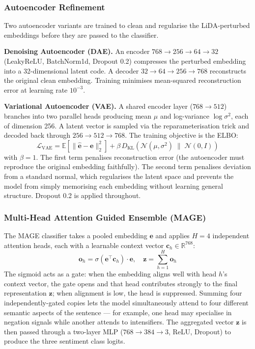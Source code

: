 \documentclass[conference]{IEEEtran}
\begin{document}
\subsubsection{Autoencoder Refinement}
Two autoencoder variants are trained to clean and regularise the
LiDA-perturbed embeddings before they are passed to the classifier.

\textbf{Denoising Autoencoder (DAE).} An encoder
$768 \to 256 \to 64 \to 32$ (LeakyReLU, BatchNorm1d, Dropout 0.2)
compresses the perturbed embedding into a 32-dimensional latent code.
A decoder $32 \to 64 \to 256 \to 768$ reconstructs the original clean
embedding. Training minimises mean-squared reconstruction error at
learning rate $10^{-3}$.

\textbf{Variational Autoencoder (VAE).} A shared encoder layer
($768 \to 512$) branches into two parallel heads producing mean $\mu$
and log-variance $\log\sigma^2$, each of dimension 256. A latent vector
is sampled via the reparameterisation trick and decoded back through
$256 \to 512 \to 768$. The training objective is the ELBO:
\begin{equation}
    \mathcal{L}_{\text{VAE}} =
    \mathbb{E}\!\left[\|\hat{\mathbf{e}} - \mathbf{e}\|_2^2\right]
    + \beta\,D_{\text{KL}}\!\left(
      \mathcal{N}(\mu, \sigma^2)
      \;\big\|\;
      \mathcal{N}(0, I)
    \right)
    \label{eq:vae}
\end{equation}
with $\beta = 1$. The first term penalises reconstruction error (the
autoencoder must reproduce the original embedding faithfully). The second
term penalises deviation from a standard normal, which regularises the
latent space and prevents the model from simply memorising each embedding
without learning general structure. Dropout 0.2 is applied throughout.

\subsubsection{Multi-Head Attention Guided Ensemble (MAGE)}
The MAGE classifier takes a pooled embedding $\mathbf{e}$ and applies
$H = 4$ independent attention heads, each with a learnable context
vector $\mathbf{c}_h \in \mathbb{R}^{768}$:
\begin{equation}
    \mathbf{o}_h =
    \sigma\!\left(\mathbf{e}^{\top} \mathbf{c}_h\right) \cdot \mathbf{e},
    \quad
    \mathbf{z} = \sum_{h=1}^{H} \mathbf{o}_h
    \label{eq:mage}
\end{equation}
The sigmoid acts as a gate: when the embedding aligns well with head $h$'s
context vector, the gate opens and that head contributes strongly to the
final representation $\mathbf{z}$; when alignment is low, the head is
suppressed. Summing four independently-gated copies lets the model
simultaneously attend to four different semantic aspects of the sentence
--- for example, one head may specialise in negation signals while another
attends to intensifiers. The aggregated vector $\mathbf{z}$ is then passed
through a two-layer MLP ($768 \to 384 \to 3$, ReLU, Dropout) to produce
the three sentiment class logits.
\end{document}
